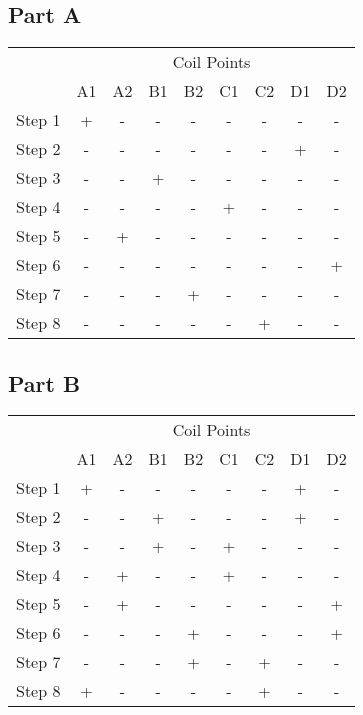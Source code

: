 \documentclass{article}
\begin{document}
	\subsection*{Part A}
		\begin{table}[H]
			\begin{tabular}{c|c|c|c|c|c|c|c|c|}
				\cline{2-9}
				& \multicolumn{8}{|c|}{Coil Points}\\
				\cline{2-9}
				& A1 & A2 & B1 & B2 & C1 & C2 & D1 & D2\\
				\hline
				\multicolumn{1}{|c|}{Step 1} & + & - & - & - & - & - & - & -\\
				\hline
				\multicolumn{1}{|c|}{Step 2} & - & - & - & - & - & - & + & -\\
				\hline
				\multicolumn{1}{|c|}{Step 3} & - & - & + & - & - & - & - & -\\
				\hline
				\multicolumn{1}{|c|}{Step 4} & - & - & - & - & + & - & - & -\\
				\hline
				\multicolumn{1}{|c|}{Step 5} & - & + & - & - & - & - & - & -\\
				\hline
				\multicolumn{1}{|c|}{Step 6} & - & - & - & - & - & - & - & +\\
				\hline
				\multicolumn{1}{|c|}{Step 7} & - & - & - & + & - & - & - & -\\
				\hline
				\multicolumn{1}{|c|}{Step 8} & - & - & - & - & - & + & - & -\\
				\hline
			\end{tabular}
		\end{table}
	
	\subsection*{Part B}
		\begin{table}[H]
			\begin{tabular}{c|c|c|c|c|c|c|c|c|}
				\cline{2-9}
				& \multicolumn{8}{|c|}{Coil Points}\\
				\cline{2-9}
				& A1 & A2 & B1 & B2 & C1 & C2 & D1 & D2\\
				\hline
				\multicolumn{1}{|c|}{Step 1} & + & - & - & - & - & - & + & -\\
				\hline
				\multicolumn{1}{|c|}{Step 2} & - & - & + & - & - & - & + & -\\
				\hline
				\multicolumn{1}{|c|}{Step 3} & - & - & + & - & + & - & - & -\\
				\hline
				\multicolumn{1}{|c|}{Step 4} & - & + & - & - & + & - & - & -\\
				\hline
				\multicolumn{1}{|c|}{Step 5} & - & + & - & - & - & - & - & +\\
				\hline
				\multicolumn{1}{|c|}{Step 6} & - & - & - & + & - & - & - & +\\
				\hline
				\multicolumn{1}{|c|}{Step 7} & - & - & - & + & - & + & - & -\\
				\hline
				\multicolumn{1}{|c|}{Step 8} & + & - & - & - & - & + & - & -\\
				\hline
			\end{tabular}
		\end{table}
	
\end{document}
